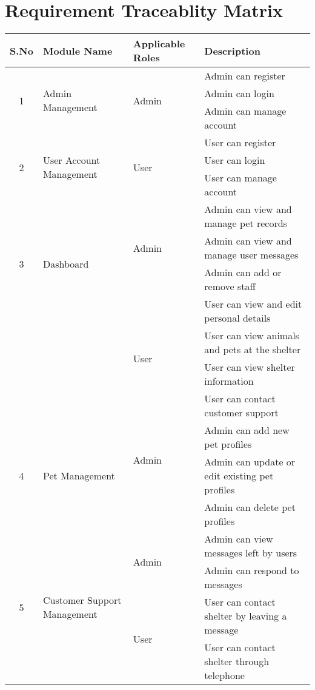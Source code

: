 \section{Requirement Traceablity Matrix}

\begin{table}[htbp]
\centering
\renewcommand{\arraystretch}{1.4}
\begin{tabular}{|c|p{3cm}|p{2cm}|p{6cm}|}
\hline
\textbf{S.No} & \textbf{Module Name} & \textbf{Applicable Roles} & \textbf{Description} \\
\hline
\multirow{3}{*}{1} & \multirow{3}{=}{Admin Management} & \multirow{3}{=}{Admin} & Admin can register \\
 &  &  & Admin can login \\
 &  &  & Admin can manage account \\
\hline
\multirow{3}{*}{2} & \multirow{3}{=}{User Account Management} & \multirow{3}{=}{User} & User can register \\
 &  &  & User can login \\
 &  &  & User can manage account \\
\hline
\multirow{4}{*}{3} & \multirow{4}{=}{Dashboard} & \multirow{3}{=}{Admin} & Admin can view and manage pet records \\
 &  &  & Admin can view and manage user messages \\
 &  &  & Admin can add or remove staff \\
\cline{3-4}
 &  & \multirow{4}{=}{User}  & User can view and edit personal details \\
 &  &  & User can view animals and pets at the shelter \\
 &  &  & User can view shelter information \\
 &  &  & User can contact customer support \\
\hline
\multirow{3}{*}{4} & \multirow{3}{=}{Pet Management} & \multirow{2}{=}{Admin} & Admin can add new pet profiles \\
 &  &  & Admin can update or edit existing pet profiles \\
 &  &  & Admin can delete pet profiles \\
\hline
\multirow{4}{*}{5} & \multirow{4}{=}{Customer Support Management} & \multirow{2}{=}{Admin} & Admin can view messages left by users \\
 &  &  & Admin can respond to messages \\
\cline{3-4}
 &  & \multirow{2}{=}{User} & User can contact shelter by leaving a message \\
 &  &  & User can contact shelter through telephone \\
\hline
\end{tabular}
\end{table}



